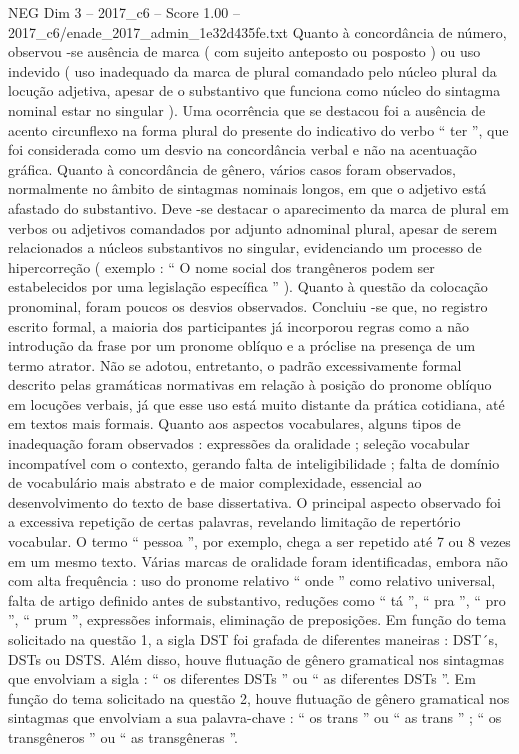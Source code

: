\begin{textsample}{NEG Dim 3 – 2017\_c6 – Score 1.00 – 2017\_c6/enade\_2017\_admin\_1e32d435fe.txt}
Quanto à concordância de número, observou -se ausência de marca ( com sujeito anteposto ou posposto ) ou uso indevido ( uso inadequado da marca de plural comandado pelo núcleo plural da locução adjetiva, apesar de o substantivo que funciona como núcleo do sintagma nominal estar no singular ).
Uma ocorrência que se destacou foi a ausência de acento circunflexo na forma plural do presente do indicativo do verbo “ ter ”, que foi considerada como um desvio na concordância verbal e não na acentuação gráfica.
Quanto à concordância de gênero, vários casos foram observados, normalmente no âmbito de sintagmas nominais longos, em que o adjetivo está afastado do substantivo.
Deve -se destacar o aparecimento da marca de plural em verbos ou adjetivos comandados por adjunto adnominal plural, apesar de serem relacionados a núcleos substantivos no singular, evidenciando um processo de hipercorreção ( exemplo : “ O nome social dos trangêneros podem ser estabelecidos por uma legislação específica ” ).
Quanto à questão da colocação pronominal, foram poucos os desvios observados.
Concluiu -se que, no registro escrito formal, a maioria dos participantes já incorporou regras como a não introdução da frase por um pronome oblíquo e a próclise na presença de um termo atrator.
Não se adotou, entretanto, o padrão excessivamente formal descrito pelas gramáticas normativas em relação à posição do pronome oblíquo em locuções verbais, já que esse uso está muito distante da prática cotidiana, até em textos mais formais.
Quanto aos aspectos vocabulares, alguns tipos de inadequação foram observados : expressões da oralidade ; seleção vocabular incompatível com o contexto, gerando falta de inteligibilidade ; falta de domínio de vocabulário mais abstrato e de maior complexidade, essencial ao desenvolvimento do texto de base dissertativa.
O principal aspecto observado foi a excessiva repetição de certas palavras, revelando limitação de repertório vocabular.
O termo “ pessoa ”, por exemplo, chega a ser repetido até 7 ou 8 vezes em um mesmo texto.
Várias marcas de oralidade foram identificadas, embora não com alta frequência : uso do pronome relativo “ onde ” como relativo universal, falta de artigo definido antes de substantivo, reduções como “ tá ”, “ pra ”, “ pro ”, “ prum ”, expressões informais, eliminação de preposições.
Em função do tema solicitado na questão 1, a sigla DST foi grafada de diferentes maneiras : DST´s, DSTs ou DSTS.
Além disso, houve flutuação de gênero gramatical nos sintagmas que envolviam a sigla : “ os diferentes DSTs ” ou “ as diferentes DSTs ”.
Em função do tema solicitado na questão 2, houve flutuação de gênero gramatical nos sintagmas que envolviam a sua palavra-chave : “ os trans ” ou “ as trans ” ; “ os transgêneros ” ou “ as transgêneras ”.

\end{textsample}
